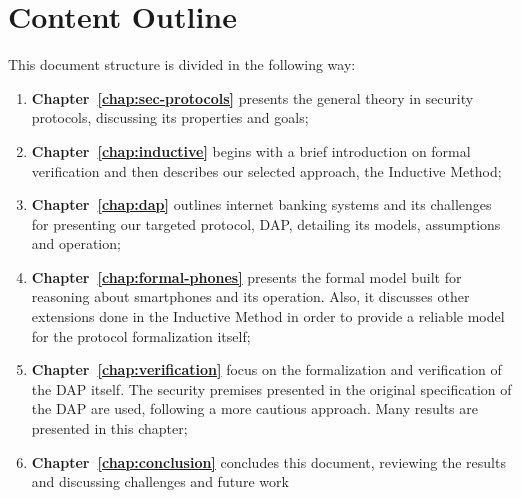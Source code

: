 \section{Content Outline}
This document structure is divided in the following way:

\begin{enumerate}
    \item \textbf{Chapter~\ref{chap:sec-protocols}} presents the general theory in security protocols, discussing its properties and goals;

    \item \textbf{Chapter~\ref{chap:inductive}} begins with a brief introduction on formal verification and then describes our selected approach, the Inductive Method;

    \item \textbf{Chapter~\ref{chap:dap}} outlines internet banking systems and its challenges for presenting our targeted protocol, DAP, detailing its models, assumptions and operation;
    
    \item \textbf{Chapter~\ref{chap:formal-phones}} presents the formal model built for reasoning about smartphones and its operation. Also, it discusses other extensions done in the Inductive Method in order to provide a reliable model for the protocol formalization itself;

    \item \textbf{Chapter~\ref{chap:verification}} focus on the formalization and verification of the DAP itself. The security premises presented in the original specification of the DAP are used, following a more cautious approach. Many results are presented in this chapter; 
    
    \item \textbf{Chapter~\ref{chap:conclusion}} concludes this document, reviewing the results and discussing challenges and future work
\end{enumerate}
